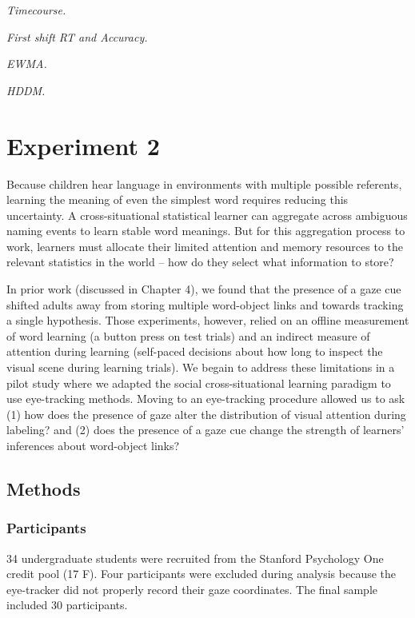 \documentclass[man,floatsintext]{apa6}
\theoremstyle{definition}
\theoremstyle{definition}
\theoremstyle{definition}
\theoremstyle{remark}
\begin{document}
\emph{Timecourse.}

\emph{First shift RT and Accuracy.}

\emph{EWMA.}

\emph{HDDM.}

\section{Experiment 2}\label{experiment-2}

Because children hear language in environments with multiple possible
referents, learning the meaning of even the simplest word requires
reducing this uncertainty. A cross-situational statistical learner can
aggregate across ambiguous naming events to learn stable word meanings.
But for this aggregation process to work, learners must allocate their
limited attention and memory resources to the relevant statistics in the
world -- how do they select what information to store?

In prior work (discussed in Chapter 4), we found that the presence of a
gaze cue shifted adults away from storing multiple word-object links and
towards tracking a single hypothesis. Those experiments, however, relied
on an offline measurement of word learning (a button press on test
trials) and an indirect measure of attention during learning (self-paced
decisions about how long to inspect the visual scene during learning
trials). We begain to address these limitations in a pilot study where
we adapted the social cross-situational learning paradigm to use
eye-tracking methods. Moving to an eye-tracking procedure allowed us to
ask (1) how does the presence of gaze alter the distribution of visual
attention during labeling? and (2) does the presence of a gaze cue
change the strength of learners' inferences about word-object links?

\subsection{Methods}\label{methods-1}

\subsubsection{Participants}\label{participants-1}

34 undergraduate students were recruited from the Stanford Psychology
One credit pool (17 F). Four participants were excluded during analysis
because the eye-tracker did not properly record their gaze coordinates.
The final sample included 30 participants.
\end{document}
